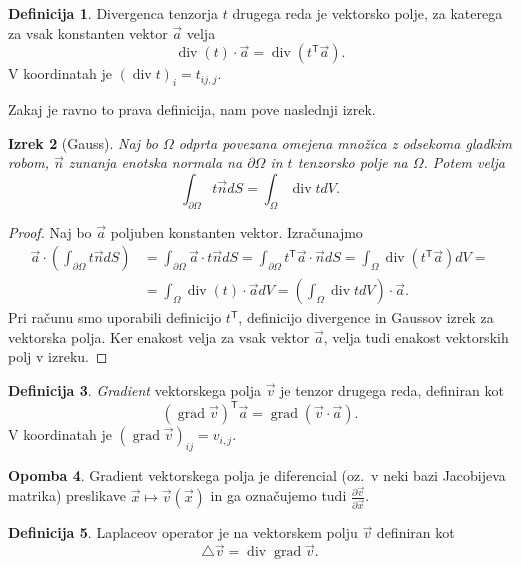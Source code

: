 \documentclass[12pt,a4paper,twoside]{article}
\theoremstyle{definition} %
\newtheorem{definicija}{Definicija}[section]
\newtheorem{opomba}[definicija]{Opomba}
\theoremstyle{plain} %
\newtheorem{izrek}[definicija]{Izrek}
\numberwithin{equation}{section}
\newcommand{\T}{\mathsf{T}}
\newcommand{\lap}{\triangle}
\renewcommand{\div}{\operatorname{div}}
\newcommand{\grad}{\operatorname{grad}}
\newcommand{\dpar}[2]{\ensuremath{\frac{\partial #1}{\partial #2}}}
\newcommand{\vv}{\vec{v}}
\newcommand{\va}{\vec{a}}
\newcommand{\vn}{\vec{n}}
\newcommand{\vx}{\vec{x}}
\begin{document}
\begin{definicija}
  Divergenca tenzorja $t$ drugega reda je vektorsko polje, za katerega za vsak
  konstanten vektor $\va$ velja
  \begin{equation}
    \div(t)\cdot \va = \div(t^\T \va).
  \end{equation}
  V koordinatah je $(\div t)_i = t_{ij,j}$.
\end{definicija}

Zakaj je ravno to prava definicija, nam pove naslednji izrek.
\begin{izrek}[Gauss]
  \label{izr:gauss}
  Naj bo $\Omega$ odprta povezana omejena množica z odsekoma gladkim robom, $\vn$ zunanja enotska
  normala na $\partial \Omega$ in $t$ tenzorsko polje na $\Omega$.  Potem velja
  \begin{equation}
    \int_{\partial \Omega} t\vn dS = \int_{\Omega} \div t dV.
  \end{equation}
\end{izrek}
\begin{proof}
Naj bo $\va$ poljuben konstanten vektor. Izračunajmo
\begin{align*}
  \va \cdot \left( \int_{\partial \Omega} t\vn dS \right) &=
  \int_{\partial \Omega}\va \cdot t\vn dS =
  \int_{\partial \Omega}t^\T \va \cdot \vn dS =
  \int_{\Omega}\div(t^\T \va) dV = \\ &=
  \int_{\Omega}\div(t) \cdot \va dV =
  \left(\int_{\Omega}\div t dV\right) \cdot \va.
\end{align*}
Pri računu smo uporabili definicijo $t^\T$, definicijo divergence in Gaussov
izrek za vektorska polja. Ker enakost velja za vsak vektor $\va$, velja tudi
enakost vektorskih polj v izreku.
\end{proof}

\begin{definicija}
  \emph{Gradient} vektorskega polja $\vv$ je tenzor drugega reda, definiran kot
  \begin{equation}
    (\grad\vv)^\T \va = \grad(\vv\cdot\va).
  \end{equation}
  V koordinatah je $(\grad\vv)_{ij} = v_{i,j}$.
\end{definicija}
\begin{opomba}
  Gradient vektorskega polja je diferencial (oz.~v neki bazi Jacobijeva matrika)
  preslikave $\vx \mapsto \vv(\vx)$ in ga označujemo tudi $\dpar{\vv}{\vx}$.
\end{opomba}

\begin{definicija}
  Laplaceov operator je na vektorskem polju $\vv$ definiran kot
  \begin{equation}
    \lap \vv = \div\grad \vv.
  \end{equation}
\end{definicija}
\end{document}
